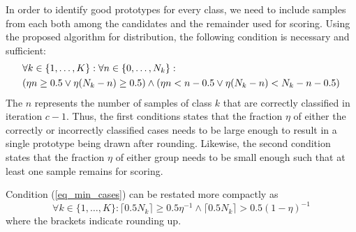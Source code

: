 %
In order to identify good prototypes for every class, we need to include samples from each both among the candidates and the remainder used for scoring. Using the proposed algorithm for distribution, the following condition is necessary and sufficient:
%
\begin{align}
&\forall k\in\{1,\dots,K\}:\forall n\in\{0,\dots,N_k\}:\label{eq_min_cases}\\
&(\eta n\geq0.5\vee\eta(N_k-n)\geq0.5)\wedge(\eta n<n-0.5\vee\eta(N_k-n)<N_k-n-0.5)\notag
\end{align}
%
The $n$ represents the number of samples of class $k$ that are correctly classified in iteration $c-1$.
Thus, the first conditions states that the fraction $\eta$ of either the correctly or incorrectly classified cases needs to be large enough to result in a single prototype being drawn after rounding.
Likewise, the second condition states that the fraction $\eta$ of either group needs to be small enough such that at least one sample remains for scoring.\par
%
\begin{lemma}
Condition (\ref{eq_min_cases}) can be restated more compactly as
%
\begin{equation}
\forall k\in\{1,\dots,K\}:\lceil0.5N_k\rceil\geq0.5\eta^{-1}\wedge\lceil0.5N_k\rceil>0.5(1-\eta)^{-1}\label{eq_min_cases_2}
\end{equation}
%
where the brackets indicate rounding up.
\end{lemma}
%
